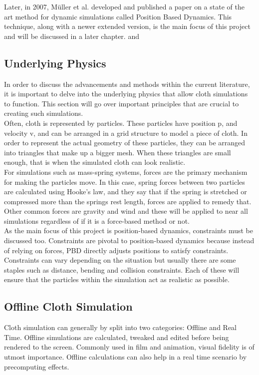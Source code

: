 \documentclass[12pt,a4paper]{article}
\begin{document}
Later, in 2007, Müller et al. developed and published a paper on a state of the art method for dynamic simulations called Position Based Dynamics. This technique, along with a newer extended version, is the main focus of this project and will be discussed in a later chapter. \cite{muller2007position} and \cite{macklin2016xpbd}

\subsection{Underlying Physics}
\label{Physics}
In order to discuss the advancements and methods within the current literature, it is important to delve into the underlying physics that allow cloth simulations to function. This section will go over important principles that are crucial to creating such simulations.
\\

Often, cloth is represented by particles. These particles have position p, and velocity v, and can be arranged in a grid structure to model a piece of cloth. In order to represent the actual geometry of these particles, they can be arranged into triangles that make up a bigger mesh. When these triangles are small enough, that is when the simulated cloth can look realistic.
\\

For simulations such as mass-spring systems, forces are the primary mechanism for making the particles move. In this case, spring forces between two particles are calculated using Hooke's law, and they say that if the spring is stretched or compressed more than the springs rest length, forces are applied to remedy that. Other common forces are gravity and wind and these will be applied to near all simulations regardless of if it is a force-based method or not.
\\

As the main focus of this project is position-based dynamics, constraints must be discussed too. Constraints are pivotal to position-based dynamics because instead of relying on forces, PBD directly adjusts positions to satisfy constraints. Constraints can vary depending on the situation but usually there are some staples such as distance, bending and collision constraints. Each of these will ensure that the particles within the simulation act as realistic as possible. 


\subsection{Offline Cloth Simulation} 
Cloth simulation can generally by split into two categories: Offline and Real Time. Offline simulations are calculated, tweaked and edited before being rendered to the screen. Commonly used in film and animation, visual fidelity is of utmost importance. Offline calculations can also help in a real time scenario by precomputing effects. \\
\end{document}
